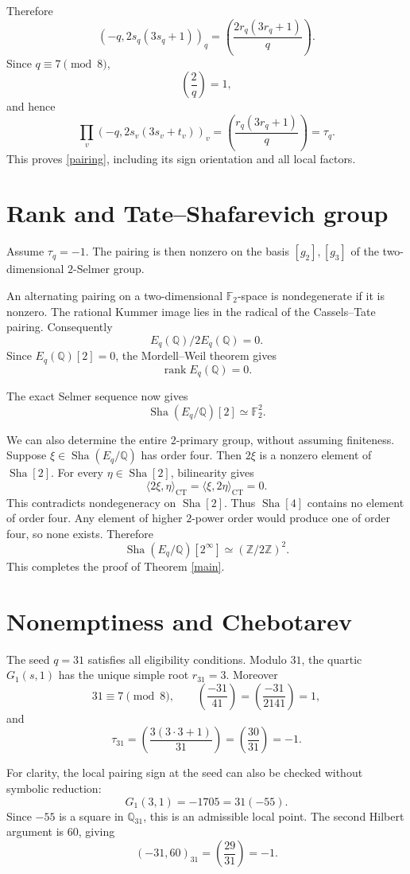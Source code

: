\documentclass[11pt]{article}
\newcommand{\Q}{\mathbb Q}
\newcommand{\F}{\mathbb F}
\newcommand{\Z}{\mathbb Z}
\newcommand{\Sha}{\mathop{\mathrm{Sha}}}
\newcommand{\CT}{\mathrm{CT}}
\begin{document}
Therefore
\[
(-q,2s_q(3s_q+1))_q
=\left(\frac{2r_q(3r_q+1)}q\right).
\]
Since $q\equiv7\pmod8$,
\[
\left(\frac2q\right)=1,
\]
and hence
\[
\prod_v(-q,2s_v(3s_v+t_v))_v
=\left(\frac{r_q(3r_q+1)}q\right)=\tau_q.
\]
This proves \eqref{pairing}, including its sign
orientation and all local factors.

\section{Rank and Tate--Shafarevich group}

Assume $\tau_q=-1$.
The pairing is then nonzero on the basis
$[g_2],[g_3]$ of the two-dimensional
$2$-Selmer group.

An alternating pairing on a two-dimensional
$\F_2$-space is nondegenerate if it is nonzero.
The rational Kummer image lies in the radical
of the Cassels--Tate pairing. Consequently
\[
E_q(\Q)/2E_q(\Q)=0.
\]
Since $E_q(\Q)[2]=0$, the Mordell--Weil theorem gives
\[
\operatorname{rank}E_q(\Q)=0.
\]

The exact Selmer sequence now gives
\[
\Sha(E_q/\Q)[2]\simeq\F_2^2.
\]

We can also determine the entire $2$-primary group,
without assuming finiteness.
Suppose $\xi\in\Sha(E_q/\Q)$ has order four.
Then $2\xi$ is a nonzero element of $\Sha[2]$.
For every $\eta\in\Sha[2]$,
bilinearity gives
\[
\langle2\xi,\eta\rangle_{\CT}
=\langle\xi,2\eta\rangle_{\CT}=0.
\]
This contradicts nondegeneracy on $\Sha[2]$.
Thus $\Sha[4]$ contains no element of order four.
Any element of higher $2$-power order would
produce one of order four, so none exists.
Therefore
\[
\boxed{\Sha(E_q/\Q)[2^\infty]\simeq(\Z/2\Z)^2.}
\]
This completes the proof of Theorem \ref{main}.

\section{Nonemptiness and Chebotarev}

The seed $q=31$ satisfies all eligibility conditions.
Modulo $31$, the quartic $G_1(s,1)$ has the
unique simple root $r_{31}=3$.
Moreover
\[
31\equiv7\pmod8,\qquad
\left(\frac{-31}{41}\right)
=\left(\frac{-31}{2141}\right)=1,
\]
and
\[
\tau_{31}
=\left(\frac{3(3\cdot3+1)}{31}\right)
=\left(\frac{30}{31}\right)=-1.
\]

For clarity, the local pairing sign at the seed
can also be checked without symbolic reduction:
\[
G_1(3,1)=-1705=31(-55).
\]
Since $-55$ is a square in $\Q_{31}$,
this is an admissible local point.
The second Hilbert argument is $60$, giving
\[
(-31,60)_{31}
=\left(\frac{29}{31}\right)=-1.
\]
\end{document}
